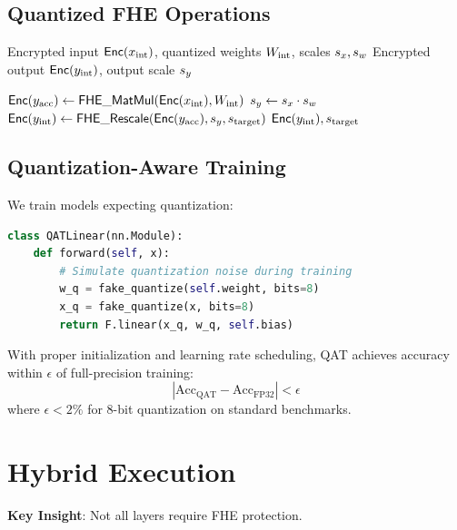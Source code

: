 \documentclass{../shared/luxfhe}
\begin{document}
\subsection{Quantized FHE Operations}

\begin{algorithm}
\caption{Quantized FHE Linear Layer}
\begin{algorithmic}[1]
\Require Encrypted input $\mathsf{Enc}(x_{\text{int}})$, quantized weights $W_{\text{int}}$, scales $s_x, s_w$
\Ensure Encrypted output $\mathsf{Enc}(y_{\text{int}})$, output scale $s_y$

\State $\mathsf{Enc}(y_{\text{acc}}) \gets \mathsf{FHE\_MatMul}(\mathsf{Enc}(x_{\text{int}}), W_{\text{int}})$
\State $s_y \gets s_x \cdot s_w$
\State {}
\State $\mathsf{Enc}(y_{\text{int}}) \gets \mathsf{FHE\_Rescale}(\mathsf{Enc}(y_{\text{acc}}), s_y, s_{\text{target}})$
\State \Return $\mathsf{Enc}(y_{\text{int}}), s_{\text{target}}$
\end{algorithmic}
\end{algorithm}

\subsection{Quantization-Aware Training}

We train models expecting quantization:

\begin{lstlisting}[language=Python,caption=QAT Training Loop]
class QATLinear(nn.Module):
    def forward(self, x):
        # Simulate quantization noise during training
        w_q = fake_quantize(self.weight, bits=8)
        x_q = fake_quantize(x, bits=8)
        return F.linear(x_q, w_q, self.bias)
\end{lstlisting}

\begin{theorem}
With proper initialization and learning rate scheduling, QAT achieves accuracy within $\epsilon$ of full-precision training:
\[
|\text{Acc}_{\text{QAT}} - \text{Acc}_{\text{FP32}}| < \epsilon
\]
where $\epsilon < 2\%$ for 8-bit quantization on standard benchmarks.
\end{theorem}

\section{Hybrid Execution}

\textbf{Key Insight}: Not all layers require FHE protection.
\end{document}
